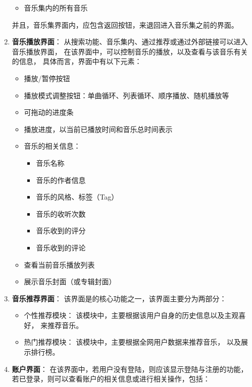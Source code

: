 \begin{enumerate}
\begin{itemize}
\begin{itemize}
            \end{itemize}
            \item 音乐集内的所有音乐
        \end{itemize}
    并且，音乐集界面内，应包含返回按钮，来退回进入音乐集之前的界面。
    \item \textbf{音乐播放界面}：
    从搜索功能、音乐集内、通过推荐或通过外部链接可以进入音乐播放界面，
        在该界面中，可以控制音乐的播放，以及查看与该音乐有关的信息，
        具体而言，界面中有以下元素：
        \begin{itemize}
            \item 播放/暂停按钮
            \item 播放模式调整按钮：单曲循环、列表循环、顺序播放、随机播放等
            \item 可拖动的进度条
            \item 播放进度，以当前已播放时间和音乐总时间表示
            \item 音乐的相关信息：
            \begin{itemize}
                \item 音乐名称
                \item 音乐的作者信息
                \item 音乐的风格、标签（Tag）
                \item 音乐的收听次数
                \item 音乐收到的评分
                \item 音乐收到的评论
            \end{itemize}
            \item 查看当前音乐播放列表
            \item 展示音乐封面（或专辑封面）
        \end{itemize}
    \item \textbf{音乐推荐界面}：
        该界面是\proname 的核心功能之一，该界面主要分为两部分：
        \begin{itemize}
            \item 个性推荐模块：
                该模块中，主要根据该用户自身的历史信息以及主观喜好，
                来推荐音乐。
            \item 热门推荐模块：
                该模块中，主要根据全网用户数据来推荐音乐，
                以及展示排行榜。
        \end{itemize}
    \item \textbf{账户界面}：
        在该界面中，若用户没有登陆，则应该显示登陆与注册的功能，
        若已登录，则可以查看账户的相关信息或进行相关操作，包括：

\end{enumerate}

